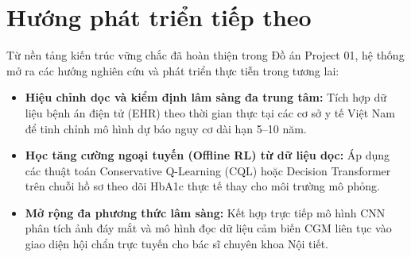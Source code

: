 \section*{Hướng phát triển tiếp theo}

Từ nền tảng kiến trúc vững chắc đã hoàn thiện trong Đồ án Project 01, hệ thống mở ra các hướng nghiên cứu và phát triển thực tiễn trong tương lai:
\begin{itemize}[leftmargin=1.5em]
  \item \textbf{Hiệu chỉnh dọc và kiểm định lâm sàng đa trung tâm:} Tích hợp dữ liệu bệnh án điện tử (EHR) theo thời gian thực tại các cơ sở y tế Việt Nam để tinh chỉnh mô hình dự báo nguy cơ dài hạn 5--10 năm.
  \item \textbf{Học tăng cường ngoại tuyến (Offline RL) từ dữ liệu dọc:} Áp dụng các thuật toán Conservative Q-Learning (CQL) hoặc Decision Transformer trên chuỗi hồ sơ theo dõi HbA1c thực tế thay cho môi trường mô phỏng.
  \item \textbf{Mở rộng đa phương thức lâm sàng:} Kết hợp trực tiếp mô hình CNN phân tích ảnh đáy mắt và mô hình  đọc dữ liệu cảm biến CGM liên tục vào giao diện hội chẩn trực tuyến cho bác sĩ chuyên khoa Nội tiết.
\end{itemize}
